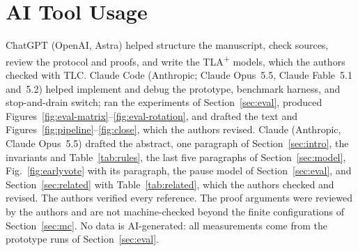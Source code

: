 \documentclass[conference]{IEEEtran}
\providecommand{\fillin}[1]{\fbox{\textsf{\footnotesize #1}}}
\begin{document}













\section*{AI Tool Usage}
ChatGPT (OpenAI, Astra) helped structure the manuscript, check sources, review the protocol and proofs, and write the TLA\textsuperscript{+} models, which the authors checked with TLC. Claude Code (Anthropic; Claude Opus~5.5, Claude Fable~5.1 and~5.2) helped implement and debug the prototype, benchmark harness, and stop-and-drain switch; ran the experiments of Section~\ref{sec:eval}, produced Figures~\ref{fig:eval-matrix}--\ref{fig:eval-rotation}, and drafted the text and Figures~\ref{fig:pipeline}--\ref{fig:close}, which the authors revised. Claude (Anthropic, Claude Opus~5.5) drafted the abstract, one paragraph of Section~\ref{sec:intro}, the invariants and Table~\ref{tab:rules}, the last five paragraphs of Section~\ref{sec:model}, Fig.~\ref{fig:earlyvote} with its paragraph, the pause model of Section~\ref{sec:eval}, and Section~\ref{sec:related} with Table~\ref{tab:related}, which the authors checked and revised. The authors verified every reference. The proof arguments were reviewed by the authors and are not machine-checked beyond the finite configurations of Section~\ref{sec:mc}. No data is AI-generated: all measurements come from the prototype runs of Section~\ref{sec:eval}.



\end{document}
